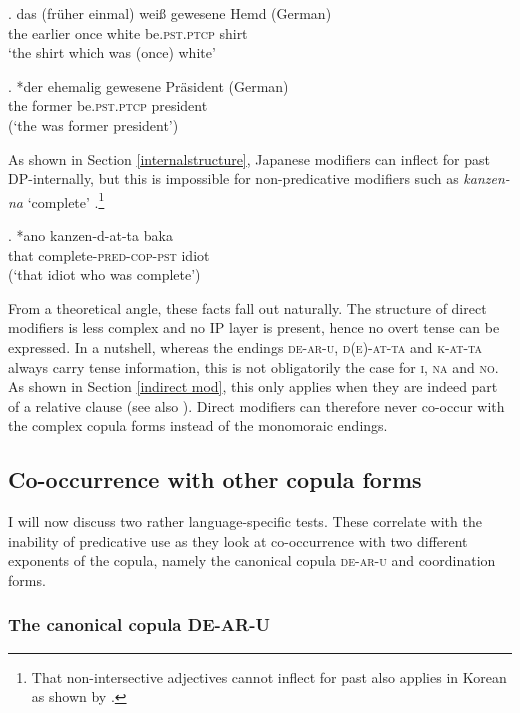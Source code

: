 \exg. das (früher einmal) weiß gewesene Hemd (German)\\
the earlier once white be.\textsc{pst.ptcp} shirt\\
`the shirt which was (once) white’ \label{ehemalig weis}

\exg. *der ehemalig gewesene Präsident (German)\\
the former be.\textsc{pst.ptcp} president\\
(`the was former president’) \label{ehemalig fruher}

As shown in Section \ref{internalstructure}, Japanese modifiers can inflect for past DP-internally, but this is impossible for non-predicative modifiers such as \textit{kanzen-na} `complete’ .\footnote{That non-intersective adjectives cannot inflect for past also applies in Korean as shown by \citet[164]{kang:2005:adj}.} 

\exg. *ano kanzen-d-at-ta baka\\
that complete-\textsc{pred-cop-pst} idiot\\
(`that idiot who was complete’) \label{kanzendatta} \null \hfill \citep[109]{ayano:2010:revisiting}

From a theoretical angle, these facts fall out naturally. The structure of direct modifiers is less complex and no IP layer is present, hence no overt tense can be expressed. In a nutshell, whereas the endings \textsc{de-ar-u}, \textsc{d(e)-at-ta} and \textsc{k-at-ta} always carry tense information, this is not obligatorily the case for \textsc{i}, \textsc{na} and \textsc{no}. As shown in Section \ref{indirect mod}, this only applies when they are indeed part of a relative clause (see also \citealt[793]{watanabe:2017:attributive}). Direct modifiers can therefore never co-occur with the complex copula forms instead of the monomoraic endings. 

\subsection{Co-occurrence with other copula forms} \label{copula}

I will now discuss two rather language-specific tests. These correlate with the inability of predicative use as they look at co-occurrence with two different exponents of the copula, namely the canonical copula \textsc{de-ar-u} and coordination forms.

\subsubsection{The canonical copula DE-AR-U}


